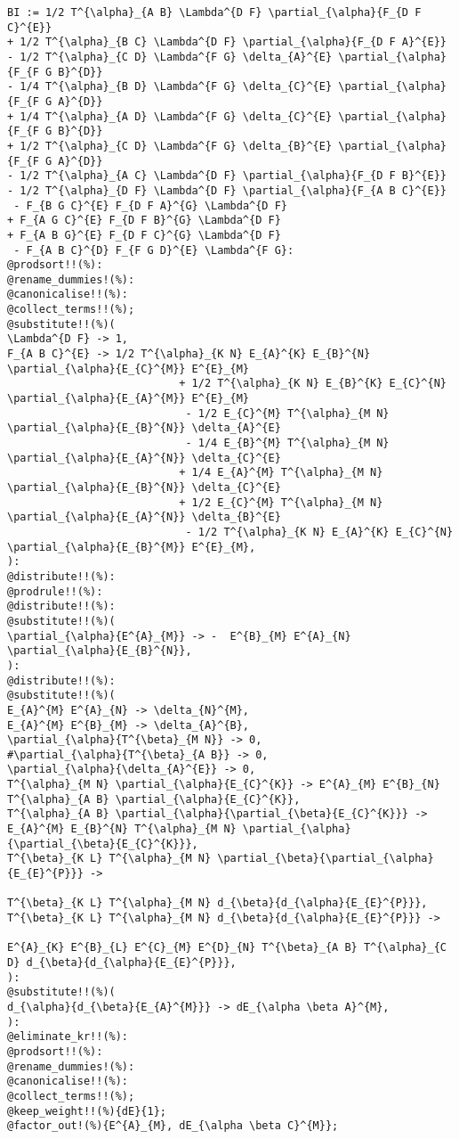 \documentclass[11pt]{article}
\begin{document}
{\color[named]{Blue}\begin{verbatim}
BI := 1/2 T^{\alpha}_{A B} \Lambda^{D F} \partial_{\alpha}{F_{D F C}^{E}}
+ 1/2 T^{\alpha}_{B C} \Lambda^{D F} \partial_{\alpha}{F_{D F A}^{E}} 
- 1/2 T^{\alpha}_{C D} \Lambda^{F G} \delta_{A}^{E} \partial_{\alpha}{F_{F G B}^{D}}
- 1/4 T^{\alpha}_{B D} \Lambda^{F G} \delta_{C}^{E} \partial_{\alpha}{F_{F G A}^{D}}
+ 1/4 T^{\alpha}_{A D} \Lambda^{F G} \delta_{C}^{E} \partial_{\alpha}{F_{F G B}^{D}}
+ 1/2 T^{\alpha}_{C D} \Lambda^{F G} \delta_{B}^{E} \partial_{\alpha}{F_{F G A}^{D}}
- 1/2 T^{\alpha}_{A C} \Lambda^{D F} \partial_{\alpha}{F_{D F B}^{E}}
- 1/2 T^{\alpha}_{D F} \Lambda^{D F} \partial_{\alpha}{F_{A B C}^{E}}
 - F_{B G C}^{E} F_{D F A}^{G} \Lambda^{D F}
+ F_{A G C}^{E} F_{D F B}^{G} \Lambda^{D F}
+ F_{A B G}^{E} F_{D F C}^{G} \Lambda^{D F}
 - F_{A B C}^{D} F_{F G D}^{E} \Lambda^{F G}:
@prodsort!!(%):
@rename_dummies!(%):
@canonicalise!!(%):
@collect_terms!!(%);
@substitute!!(%)(
\Lambda^{D F} -> 1,
F_{A B C}^{E} -> 1/2 T^{\alpha}_{K N} E_{A}^{K} E_{B}^{N} \partial_{\alpha}{E_{C}^{M}} E^{E}_{M}
                           + 1/2 T^{\alpha}_{K N} E_{B}^{K} E_{C}^{N} \partial_{\alpha}{E_{A}^{M}} E^{E}_{M}
                            - 1/2 E_{C}^{M} T^{\alpha}_{M N} \partial_{\alpha}{E_{B}^{N}} \delta_{A}^{E}
                            - 1/4 E_{B}^{M} T^{\alpha}_{M N} \partial_{\alpha}{E_{A}^{N}} \delta_{C}^{E}
                           + 1/4 E_{A}^{M} T^{\alpha}_{M N} \partial_{\alpha}{E_{B}^{N}} \delta_{C}^{E}
                           + 1/2 E_{C}^{M} T^{\alpha}_{M N} \partial_{\alpha}{E_{A}^{N}} \delta_{B}^{E}
                            - 1/2 T^{\alpha}_{K N} E_{A}^{K} E_{C}^{N} \partial_{\alpha}{E_{B}^{M}} E^{E}_{M},
):
@distribute!!(%):
@prodrule!!(%):
@distribute!!(%):
@substitute!!(%)(
\partial_{\alpha}{E^{A}_{M}} -> -  E^{B}_{M} E^{A}_{N} \partial_{\alpha}{E_{B}^{N}},
):
@distribute!!(%):
@substitute!!(%)(
E_{A}^{M} E^{A}_{N} -> \delta_{N}^{M},
E_{A}^{M} E^{B}_{M} -> \delta_{A}^{B},
\partial_{\alpha}{T^{\beta}_{M N}} -> 0,
#\partial_{\alpha}{T^{\beta}_{A B}} -> 0,
\partial_{\alpha}{\delta_{A}^{E}} -> 0,
T^{\alpha}_{M N} \partial_{\alpha}{E_{C}^{K}} -> E^{A}_{M} E^{B}_{N} T^{\alpha}_{A B} \partial_{\alpha}{E_{C}^{K}},
T^{\alpha}_{A B} \partial_{\alpha}{\partial_{\beta}{E_{C}^{K}}} -> E_{A}^{M} E_{B}^{N} T^{\alpha}_{M N} \partial_{\alpha}{\partial_{\beta}{E_{C}^{K}}},
T^{\beta}_{K L} T^{\alpha}_{M N} \partial_{\beta}{\partial_{\alpha}{E_{E}^{P}}} -> 
                                                                                                                             T^{\beta}_{K L} T^{\alpha}_{M N} d_{\beta}{d_{\alpha}{E_{E}^{P}}},
T^{\beta}_{K L} T^{\alpha}_{M N} d_{\beta}{d_{\alpha}{E_{E}^{P}}} -> 
                                                               E^{A}_{K} E^{B}_{L} E^{C}_{M} E^{D}_{N} T^{\beta}_{A B} T^{\alpha}_{C D} d_{\beta}{d_{\alpha}{E_{E}^{P}}},
):
@substitute!!(%)(
d_{\alpha}{d_{\beta}{E_{A}^{M}}} -> dE_{\alpha \beta A}^{M},
):
@eliminate_kr!!(%):
@prodsort!!(%):
@rename_dummies!(%):
@canonicalise!!(%):
@collect_terms!!(%);
@keep_weight!!(%){dE}{1};
@factor_out!(%){E^{A}_{M}, dE_{\alpha \beta C}^{M}};
\end{verbatim}}
\end{document}
